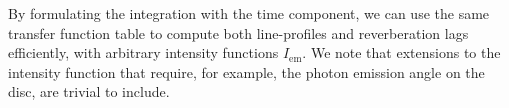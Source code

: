 By formulating the integration with the time component, we can use the same transfer function table to compute both line-profiles and reverberation lags efficiently, with arbitrary intensity functions $I_\text{em}$. We note that extensions to the intensity function that require, for example, the photon emission angle on the disc, are trivial to include.

